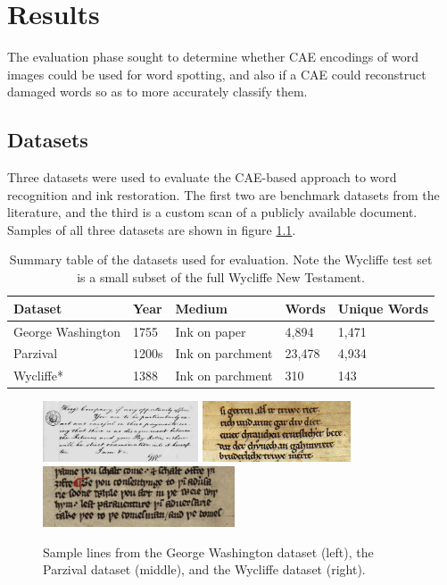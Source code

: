 \documentclass[final]{ukthesis}
\begin{document}
%
%
%
\chapter{Results}
The evaluation phase sought to determine whether CAE encodings of word images could be used for word spotting, and also if a CAE could reconstruct damaged words so as to more accurately classify them.

%
%
\section{Datasets}
Three datasets were used to evaluate the CAE-based approach to word recognition and ink restoration. The first two are benchmark datasets from the literature, and the third is a custom scan of a publicly available document. Samples of all three datasets are shown in figure \ref{fig:dataset-samples}.

\begin{table}[h]
\centering
\begin{tabular}{lllll}
\textbf{Dataset}  & \textbf{Year} & \textbf{Medium}  & \textbf{Words} & \textbf{Unique Words} \\
\hline
George Washington & 1755                  & Ink on paper     & 4,894          & 1,471                 \\
Parzival          & 1200s                 & Ink on parchment & 23,478         & 4,934                 \\
Wycliffe*         & 1388                  & Ink on parchment & 310            & 143                  
\end{tabular}
\caption{Summary table of the datasets used for evaluation. Note the Wycliffe test set is a small subset of the full Wycliffe New Testament.}
\label{table:datasets}
\end{table}

\begin{figure}[t]
\begin{center}
\includegraphics[height=1.8cm]{gw-sample}
\includegraphics[height=1.8cm]{parzival-sample}
\includegraphics[height=1.8cm]{wycliffe-sample}
\end{center}
\caption{Sample lines from the George Washington dataset (left), the Parzival dataset (middle), and the Wycliffe dataset (right).}
\label{fig:dataset-samples}
\end{figure}
\end{document}
